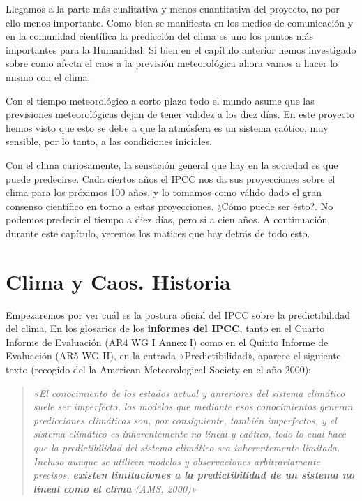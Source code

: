 \documentclass[
  10pt,
  a4paper,
  DIV=11,
  numbers=noendperiod,
  open=any]{scrreprt}
\numberwithin{equation}{chapter}
\numberwithin{equation}{section}
\renewcommand{\[}{\begin{equation}}
\renewcommand{\]}{\end{equation}}
\begin{document}
Llegamos a la parte más cualitativa y menos cuantitativa del proyecto,
no por ello menos importante. Como bien se manifiesta en los medios de
comunicación y en la comunidad científica la predicción del clima es uno
los puntos más importantes para la Humanidad. Si bien en el capítulo
anterior hemos investigado sobre como afecta el caos a la previsión
meteorológica ahora vamos a hacer lo mismo con el clima.

Con el tiempo meteorológico a corto plazo todo el mundo asume que las
previsiones meteorológicas dejan de tener validez a los diez días. En
este proyecto hemos visto que esto se debe a que la atmósfera es un
sistema caótico, muy sensible, por lo tanto, a las condiciones
iniciales.

Con el clima curiosamente, la sensación general que hay en la sociedad
es que puede predecirse. Cada ciertos años el IPCC nos da sus
proyecciones sobre el clima para los próximos 100 años, y lo tomamos
como válido dado el gran consenso científico en torno a estas
proyecciones. ¿Cómo puede ser ésto?. No podemos predecir el tiempo a
diez días, pero sí a cien años. A continuación, durante este capítulo,
veremos los matices que hay detrás de todo esto.

\section{Clima y Caos. Historia}\label{clima-y-caos.-historia}

Empezaremos por ver cuál es la postura oficial del IPCC sobre la
predictibilidad del clima. En los glosarios de los \textbf{informes del
IPCC}, tanto en el Cuarto Informe de Evaluación (AR4 WG I Annex I) como
en el Quinto Informe de Evaluación (AR5 WG II), en la entrada
«Predictibilidad», aparece el siguiente texto (recogido del la American
Meteorological Society en el año 2000):

\begin{quote}
\itshape
«El conocimiento de los estados actual y anteriores del sistema
climático suele ser imperfecto, los modelos que mediante esos
conocimientos generan predicciones climáticas son, por consiguiente,
también imperfectos, y el sistema climático es inherentemente no lineal
y caótico, todo lo cual hace que la predictibilidad del sistema
climático sea inherentemente limitada. Incluso aunque se utilicen
modelos y observaciones arbitrariamente precisos, \textbf{existen
limitaciones a la predictibilidad de un sistema no lineal como el clima}
(AMS, 2000)»
\end{quote}
\end{document}
